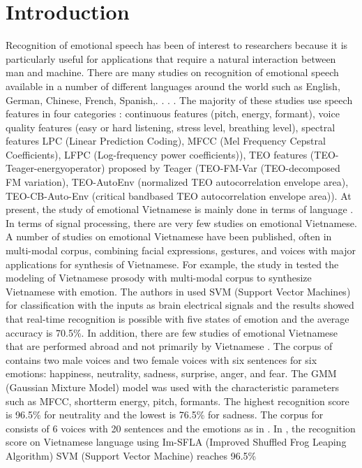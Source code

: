 \documentclass[a4paper,12pt]{article}
\begin{document}
\section{Introduction}
Recognition of emotional speech has been of interest to researchers because it is particularly useful for applications that require a natural interaction between man and machine.
There are many studies on recognition of emotional speech available in a number of different languages around the world such as English, German, Chinese, French, Spanish,. . . \cite{1}.
The majority of these studies use speech features in four categories \cite{1}: continuous features
(pitch, energy, formant), voice quality features (easy or hard listening, stress level, breathing
level), spectral features LPC (Linear Prediction Coding), MFCC (Mel Frequency Cepstral
Coefficients), LFPC (Log-frequency power coefficients)), TEO features (TEO-Teager-energyoperator) proposed by Teager (TEO-FM-Var (TEO-decomposed FM variation), TEO-AutoEnv (normalized TEO autocorrelation envelope area), TEO-CB-Auto-Env (critical bandbased TEO autocorrelation envelope area)). At present, the study of emotional Vietnamese
is mainly done in terms of language \cite{2}. In terms of signal processing, there are very few
studies on emotional Vietnamese. A number of studies on emotional Vietnamese have been
published, often in multi-modal corpus, combining facial expressions, gestures, and voices
with major applications for synthesis of Vietnamese. For example, the study in \cite{3,4} tested
the modeling of Vietnamese prosody with multi-modal corpus to synthesize Vietnamese with
emotion. The authors in \cite{5} used SVM (Support Vector Machines) for classification with the
inputs as brain electrical signals and the results showed that real-time recognition is possible with five states of emotion and the average accuracy is 70.5\%. In addition, there are few
studies of emotional Vietnamese that are performed abroad and not primarily by Vietnamese
\cite{6,7}. The corpus of \cite{6} contains two male voices and two female voices with six sentences for six emotions: happiness, neutrality, sadness, surprise, anger, and fear. The GMM (Gaussian
Mixture Model) model was used with the characteristic parameters such as MFCC, shortterm energy, pitch, formants. The highest recognition score is 96.5\% for neutrality and the
lowest is 76.5\% for sadness. The corpus for \cite{7} consists of 6 voices with 20 sentences and
the emotions as in \cite{6}. In \cite{7}, the recognition score on Vietnamese language using Im-SFLA
(Improved Shuffled Frog Leaping Algorithm) SVM (Support Vector Machine) reaches 96.5\%
\end{document}
